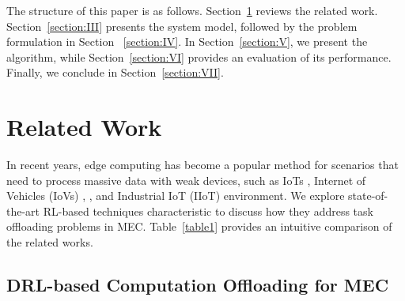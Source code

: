 \documentclass[10pt, journal,letterpaper]{IEEEtran}
\begin{document}
The structure of this paper is as follows. Section~\ref{section:II} reviews the related work. Section~\ref{section:III} presents the system model, followed by the problem formulation in Section ~\ref{section:IV}. In Section~\ref{section:V}, we present the algorithm, while Section~\ref{section:VI} provides an evaluation of its performance. Finally, we conclude in Section~\ref{section:VII}.


\section{Related Work}
\label{section:II}
	
	






In recent years, edge computing has become a popular method for scenarios that need to process massive data with weak devices, such as IoTs \cite{zhang2023multi}, Internet of Vehicles (IoVs) \cite{lin2022multi}, \cite{wei2023many}, and Industrial IoT (IIoT) \cite{yuan2023adaptive} environment.
We explore state-of-the-art RL-based techniques characteristic to discuss how they address task offloading problems in MEC. Table~\ref{table1} provides an intuitive comparison of the related works.


\subsection{DRL-based Computation Offloading for MEC}
\end{document}
